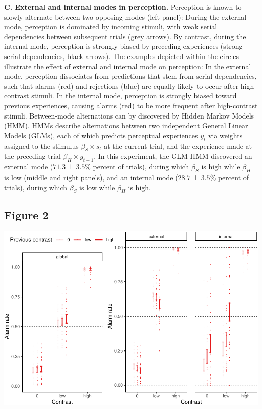 \documentclass[
]{article}
\begin{document}
\textbf{C. External and internal modes in perception.} Perception is
known to slowly alternate between two opposing modes (left panel):
During the external mode, perception is dominated by incoming stimuli,
with weak serial dependencies between subsequent trials (grey arrows).
By contrast, during the internal mode, perception is strongly biased by
preceding experiences (strong serial dependencies, black arrows). The
examples depicted within the circles illustrate the effect of external
and internal mode on perception: In the external mode, perception
dissociates from predictions that stem from serial dependencies, such
that alarms (red) and rejections (blue) are equally likely to occur
after high-contrast stimuli. In the internal mode, perception is
strongly biased toward previous experiences, causing alarms (red) to be
more frequent after high-contrast stimuli. Between-mode alternations can
by discovered by Hidden Markov Models (HMM). HMMs describe alternations
between two independent General Linear Models (GLMs), each of which
predicts perceptual experiences \(y_t\) via weights assigned to the
stimulus \(\beta_S \times s_t\) at the current trial, and the experience
made at the preceding trial \(\beta_H \times y_{t-1}\). In this
experiment, the GLM-HMM discovered an external mode (\(71.3\) ±
\(3.5\)\% percent of trials), during which \(\beta_S\) is high while
\(\beta_H\) is low (middle and right panels), and an internal mode
(\(28.7\) ± \(3.5\)\% percent of trials), during which \(\beta_S\) is
low while \(\beta_H\) is high.

\newpage

\hypertarget{figure-2}{%
\subsection{Figure 2}\label{figure-2}}

\includegraphics{predictive_templates_files/figure-latex/rev_Figure_2-1.pdf}
\end{document}
